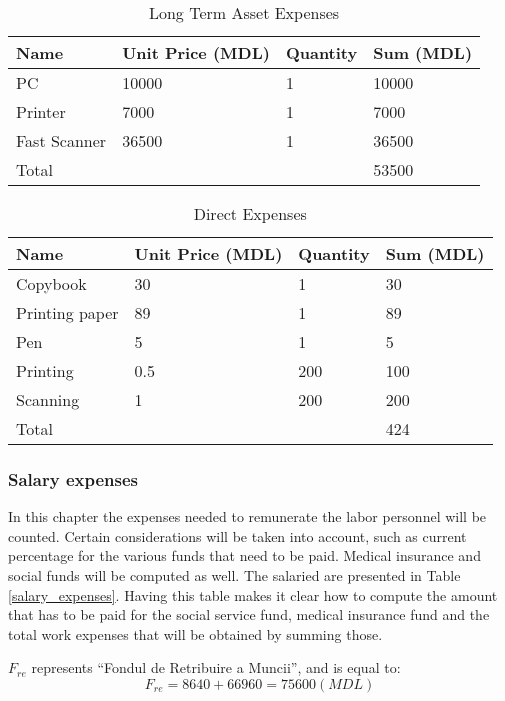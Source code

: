 \begin{table}[ht!]
\centering
\caption{Long Term Asset Expenses}
{
\renewcommand{\arraystretch}{1.25}
\begin{tabular}{ llll }
\hline
  Name & Unit Price (MDL) & Quantity & Sum (MDL) \\ \hline
  PC & 10000 & 1 & 10000 \\
  Printer & 7000 & 1 & 7000 \\
  Fast Scanner & 36500 & 1 & 36500 \\
  Total & & & 53500 \\
\hline
\end{tabular}
}
\label{longterm_asset_expenses}
\end{table}

\begin{table}[ht!]
\centering
\caption{Direct Expenses}
{
\renewcommand{\arraystretch}{1.25}
\begin{tabular}{ llll }
\hline
  Name & Unit Price (MDL) & Quantity & Sum (MDL) \\ \hline
  Copybook & 30 & 1 & 30 \\
  Printing paper & 89 & 1 & 89 \\
  Pen & 5 & 1 & 5 \\
  Printing & 0.5 & 200 & 100 \\
  Scanning & 1 & 200 & 200 \\
  Total & & & 424 \\
\hline
\end{tabular}
}
\label{direct_expenses}
\end{table}


\subsubsection{Salary expenses}
In this chapter the expenses needed to remunerate the labor personnel will be counted. Certain considerations will be taken into account, such as current percentage for the various funds that need to be paid. Medical insurance and social funds will be computed as well. The salaried are presented in Table \ref{salary_expenses}. Having this table makes it clear how to compute the amount that has to be paid for the social service fund, medical insurance fund and the total work expenses that will be obtained by summing those. 




$F_{re}$ represents “Fondul de Retribuire a Muncii”, and is equal to: 
\begin{equation}
  F_{re} = 8640 + 66960 = 75600 (MDL) \label{4.2}
\end{equation}

